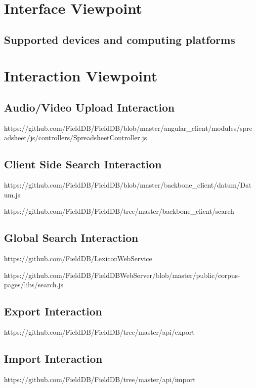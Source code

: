 \documentclass[12pt]{article}
\begin{document}
\section{Interface Viewpoint}

\subsection{Supported devices and computing platforms}

\section{Interaction Viewpoint}
\subsection{Audio/Video Upload Interaction}

https://github.com/FieldDB/FieldDB/blob/master/angular_client/modules/spreadsheet/js/controllers/SpreadsheetController.js


\subsection{Client Side Search Interaction}

https://github.com/FieldDB/FieldDB/blob/master/backbone_client/datum/Datum.js

https://github.com/FieldDB/FieldDB/tree/master/backbone_client/search

\subsection{Global Search Interaction}

https://github.com/FieldDB/LexiconWebService

https://github.com/FieldDB/FieldDBWebServer/blob/master/public/corpus-pages/libs/search.js

\subsection{Export Interaction}

https://github.com/FieldDB/FieldDB/tree/master/api/export

\subsection{Import Interaction}

https://github.com/FieldDB/FieldDB/tree/master/api/import
\end{document}
